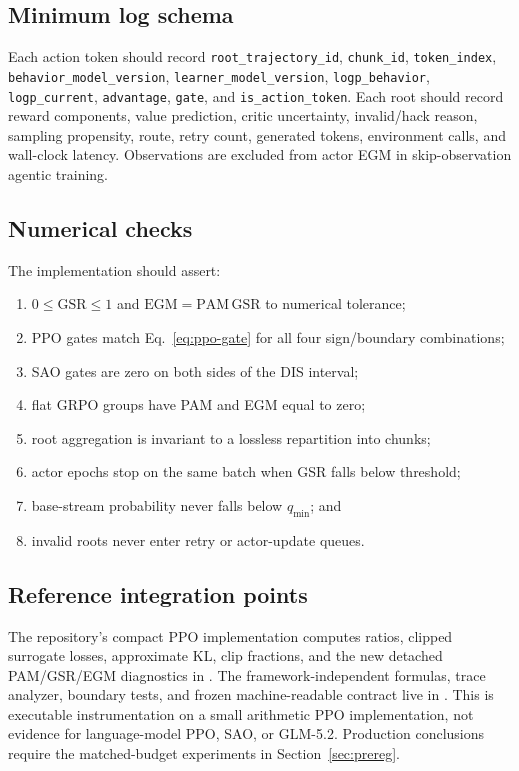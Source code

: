 \documentclass{article}
\newcommand{\egm}{\mathrm{EGM}}
\newcommand{\pam}{\mathrm{PAM}}
\newcommand{\gsr}{\mathrm{GSR}}
\begin{document}
\subsection{Minimum log schema}

Each action token should record
\texttt{root\_trajectory\_id}, \texttt{chunk\_id}, \texttt{token\_index},
\texttt{behavior\_model\_version}, \texttt{learner\_model\_version},
\texttt{logp\_behavior}, \texttt{logp\_current}, \texttt{advantage},
\texttt{gate}, and \texttt{is\_action\_token}.  Each root should record
reward components, value prediction, critic uncertainty, invalid/hack reason,
sampling propensity, route, retry count, generated tokens, environment calls,
and wall-clock latency.  Observations are excluded from actor EGM in
skip-observation agentic training.

\subsection{Numerical checks}

The implementation should assert:
\begin{enumerate}[leftmargin=*]
  \item $0\leq\gsr\leq1$ and $\egm=\pam\,\gsr$ to numerical tolerance;
  \item PPO gates match Eq.~\eqref{eq:ppo-gate} for all four sign/boundary
  combinations;
  \item SAO gates are zero on both sides of the DIS interval;
  \item flat GRPO groups have PAM and EGM equal to zero;
  \item root aggregation is invariant to a lossless repartition into chunks;
  \item actor epochs stop on the same batch when GSR falls below threshold;
  \item base-stream probability never falls below $q_{\min}$; and
  \item invalid roots never enter retry or actor-update queues.
\end{enumerate}

\subsection{Reference integration points}

The repository's compact PPO implementation computes ratios, clipped surrogate
losses, approximate KL, clip fractions, and the new detached PAM/GSR/EGM
diagnostics in
. The
framework-independent formulas, trace analyzer, boundary tests, and frozen
machine-readable contract live in
. This is executable
instrumentation on a small arithmetic PPO implementation, not evidence for
language-model PPO, SAO, or GLM-5.2. Production conclusions require the
matched-budget experiments in Section~\ref{sec:prereg}.
\end{document}
